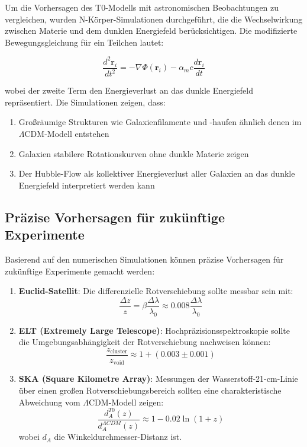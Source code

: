 \documentclass[a4paper,12pt]{article}
\theoremstyle{definition}
\theoremstyle{remark}
\begin{document}
	Um die Vorhersagen des T0-Modells mit astronomischen Beobachtungen zu vergleichen, wurden N-Körper-Simulationen durchgeführt, die die Wechselwirkung zwischen Materie und dem dunklen Energiefeld berücksichtigen. Die modifizierte Bewegungsgleichung für ein Teilchen lautet:
	
	\begin{equation}
		\frac{d^2\mathbf{r}_i}{dt^2} = -\nabla \Phi(\mathbf{r}_i) - \alpha_m c \frac{d\mathbf{r}_i}{dt}
	\end{equation}
	
	wobei der zweite Term den Energieverlust an das dunkle Energiefeld repräsentiert. Die Simulationen zeigen, dass:
	
	\begin{enumerate}
		\item Großräumige Strukturen wie Galaxienfilamente und -haufen ähnlich denen im $\Lambda$CDM-Modell entstehen
		\item Galaxien stabilere Rotationskurven ohne dunkle Materie zeigen
		\item Der Hubble-Flow als kollektiver Energieverlust aller Galaxien an das dunkle Energiefeld interpretiert werden kann
	\end{enumerate}
	
	\subsection{Präzise Vorhersagen für zukünftige Experimente}
	
	Basierend auf den numerischen Simulationen können präzise Vorhersagen für zukünftige Experimente gemacht werden:
	
	\begin{enumerate}
		\item \textbf{Euclid-Satellit}: Die differenzielle Rotverschiebung sollte messbar sein mit:
		\begin{equation}
			\frac{\Delta z}{z} = \beta \frac{\Delta \lambda}{\lambda_0} \approx 0.008 \frac{\Delta \lambda}{\lambda_0}
		\end{equation}
		
		\item \textbf{ELT (Extremely Large Telescope)}: Hochpräzisionsspektroskopie sollte die Umgebungsabhängigkeit der Rotverschiebung nachweisen können:
		\begin{equation}
			\frac{z_{\text{cluster}}}{z_{\text{void}}} \approx 1 + (0.003 \pm 0.001)
		\end{equation}
		
		\item \textbf{SKA (Square Kilometre Array)}: Messungen der Wasserstoff-21-cm-Linie über einen großen Rotverschiebungsbereich sollten eine charakteristische Abweichung vom $\Lambda$CDM-Modell zeigen:
		\begin{equation}
			\frac{d_A^{T0}(z)}{d_A^{\Lambda CDM}(z)} \approx 1 - 0.02 \ln(1+z)
		\end{equation}
		wobei $d_A$ die Winkeldurchmesser-Distanz ist.
	\end{enumerate}
	
\end{document}
